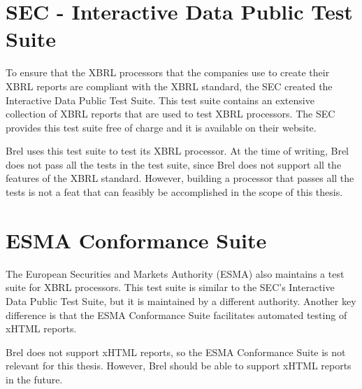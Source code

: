 \section{SEC - Interactive Data Public Test Suite}
\label{sec:idpts}
To ensure that the XBRL processors that the companies use to create their XBRL reports are compliant with the XBRL standard, the SEC created the Interactive Data Public Test Suite\cite{sec_idpts}.
This test suite contains an extensive collection of XBRL reports that are used to test XBRL processors.
The SEC provides this test suite free of charge and it is available on their website.

Brel uses this test suite to test its XBRL processor.
At the time of writing, Brel does not pass all the tests in the test suite, since Brel does not support all the features of the XBRL standard.
However, building a processor that passes all the tests is not a feat that can feasibly be accomplished in the scope of this thesis.

\section{ESMA Conformance Suite}
The European Securities and Markets Authority (ESMA) also maintains a test suite for XBRL processors\cite{esma_conformance_suite}.
This test suite is similar to the SEC's Interactive Data Public Test Suite, but it is maintained by a different authority.
Another key difference is that the ESMA Conformance Suite facilitates automated testing of xHTML reports.

Brel does not support xHTML reports, so the ESMA Conformance Suite is not relevant for this thesis.
However, Brel should be able to support xHTML reports in the future.
